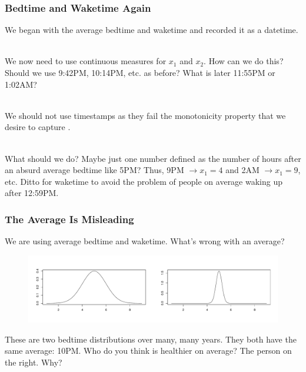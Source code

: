 \documentclass[handout]{beamer}
\begin{document}
\begin{frame}\frametitle{Bedtime and Waketime Again}

We began with the average bedtime and waketime and recorded it as a datetime.\\~\\ \pause 

We now need to use continuous measures for $x_1$ and $x_2$. How can we do this? Should we use 9:42PM, 10:14PM, etc. as before? What is later 11:55PM or 1:02AM?\\~\\ \pause 

We should not use timestamps as they fail the monotonicity property that we desire to capture .\\~\\ \pause 

What should we do? Maybe just one number defined as the number of hours after an absurd average bedtime like 5PM? Thus, 9PM $\rightarrow x_1 = 4$ and 2AM $\rightarrow x_1 = 9$, etc. Ditto for waketime to avoid the problem of people on average waking up after 12:59PM.
	
\end{frame}

\begin{frame}\frametitle{The Average Is Misleading}

We are using average bedtime and waketime. What's wrong with an average?

\begin{figure}
\centering
\includegraphics[width=4.5in]{two_dist}
\end{figure}

%
	
These are two bedtime distributions over many, many years. They both have the same average: 10PM. Who do you think is healthier on average?  \pause The person on the right. Why?
\end{frame}
\end{document}
